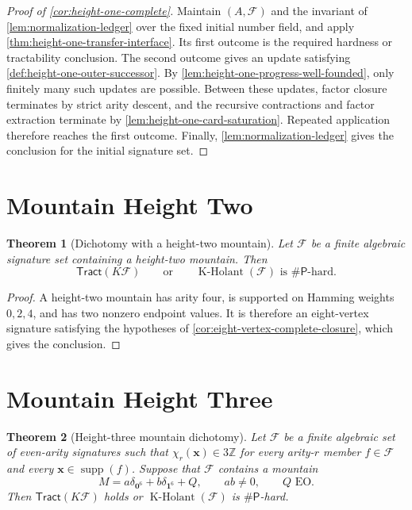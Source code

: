 \documentclass[11pt,letterpaper,onecolumn]{article}
\theoremstyle{plain}
\newtheorem{theorem}{Theorem}[section]
\theoremstyle{definition}
\theoremstyle{remark}
\newcommand{\cF}{\mathcal F}
\newcommand{\KHolant}{\operatorname{K\text{-}Holant}}
\newcommand{\Tract}{\mathsf{Tract}}
\newcommand{\SharpP}{\#\mathsf P}
\newcommand{\supp}{\operatorname{supp}}
\newcommand{\one}{\mathbf 1}
\newcommand{\zero}{\mathbf 0}
\begin{document}
	\begin{proof}[Proof of \cref{cor:height-one-complete}]
		Maintain \((A,\cF)\) and the invariant of
		\cref{lem:normalization-ledger} over the fixed initial number field, and
		apply \cref{thm:height-one-transfer-interface}.  Its first outcome is the
		required hardness or tractability conclusion.  The second outcome gives
		an update satisfying \cref{def:height-one-outer-successor}. By
		\cref{lem:height-one-progress-well-founded}, only finitely many such
		updates are possible.  Between these updates, factor closure terminates by
		strict arity descent, and the recursive contractions and factor extraction
		terminate by \cref{lem:height-one-card-saturation}.  Repeated application
		therefore reaches the first outcome.  Finally,
		\cref{lem:normalization-ledger} gives the conclusion for the
		initial signature set.
	\end{proof}
	
	\section{Mountain Height Two}
	\label{sec:height-two}
	
	
	\begin{theorem}[Dichotomy with a height-two mountain]
		\label{cor:height-two-complete}
		Let \(\cF\) be a finite algebraic signature set containing a height-two
		mountain.  Then
		\[
		\Tract(K\cF)
		\qquad\text{or}\qquad
		\KHolant(\cF)\text{ is }\SharpP\text{-hard}.
		\]
	\end{theorem}
	
	\begin{proof}
		A height-two mountain has arity four, is supported on Hamming weights
		\(0,2,4\), and has two nonzero endpoint values. It is therefore an
		eight-vertex signature satisfying the hypotheses of
		\cref{cor:eight-vertex-complete-closure}, which gives the conclusion.
	\end{proof}
	
	\section{Mountain Height Three}
	\label{sec:height-at-least-three}
	
	\begin{theorem}[Height-three mountain dichotomy]
		\label{thm:height-three-complete}
		Let \(\cF\) be a finite algebraic set of even-arity signatures such that
		\(\chi_r({\mathbf x})\in3\mathbb Z\) for every arity-\(r\) member \(f\in\cF\)
		and every \({\mathbf x}\in\supp(f)\).  Suppose that \(\cF\) contains a mountain
		\[
		M=a\delta_{\zero^6}+b\delta_{\one^6}+Q,
		\qquad ab\ne0,\qquad Q\text{ EO}.
		\]
		Then \(\Tract(K\cF)\) holds or \(\KHolant(\cF)\) is
		\(\SharpP\)-hard.
	\end{theorem}
	
\end{document}

